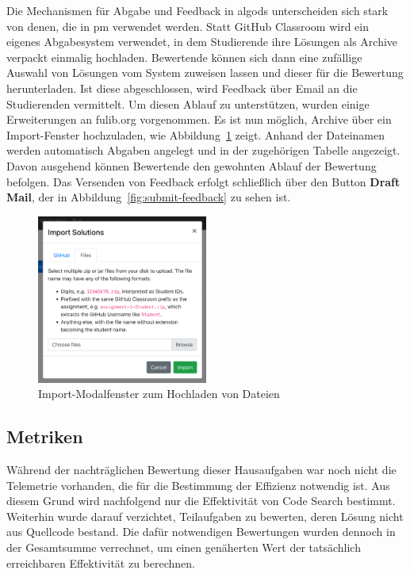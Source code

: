 Die Mechanismen für Abgabe und Feedback in \ac{algods} unterscheiden sich stark von denen, die in \ac{pm} verwendet werden.
Statt GitHub Classroom wird ein eigenes Abgabesystem verwendet, in dem Studierende ihre Lösungen als Archive verpackt einmalig hochladen.
Bewertende können sich dann eine zufällige Auswahl von Lösungen vom System zuweisen lassen und dieser für die Bewertung herunterladen.
Ist diese abgeschlossen, wird Feedback über Email an die Studierenden vermittelt.
Um diesen Ablauf zu unterstützen, wurden einige Erweiterungen an fulib.org vorgenommen.
Es ist nun möglich, Archive über ein Import-Fenster hochzuladen, wie Abbildung~\ref{fig:assignment-import-files} zeigt.
Anhand der Dateinamen werden automatisch Abgaben angelegt und in der zugehörigen Tabelle angezeigt.
Davon ausgehend können Bewertende den gewohnten Ablauf der Bewertung befolgen.
Das Versenden von Feedback erfolgt schließlich über den Button \textbf{Draft Mail}, der in Abbildung~\ref{fig:submit-feedback} zu sehen ist.

\begin{figure}
    \centering
    \includegraphics[width=0.5\textwidth]{images/assignment-import-files}
    \caption{Import-Modalfenster zum Hochladen von Dateien}
    \label{fig:assignment-import-files}
\end{figure}

\subsection{Metriken}\label{subsec:algods-metrics}

Während der nachträglichen Bewertung dieser Hausaufgaben war noch nicht die Telemetrie vorhanden, die für die Bestimmung der Effizienz notwendig ist.
Aus diesem Grund wird nachfolgend nur die Effektivität von Code Search bestimmt.
Weiterhin wurde darauf verzichtet, Teilaufgaben zu bewerten, deren Lösung nicht aus Quellcode bestand.
Die dafür notwendigen Bewertungen wurden dennoch in der Gesamtsumme verrechnet, um einen genäherten Wert der tatsächlich erreichbaren Effektivität zu berechnen.

